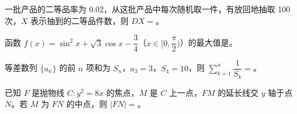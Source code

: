 \begin{question}
一批产品的二等品率为 0.02，从这批产品中每次随机取一件，有放回地抽取 100 次，\(X\) 表示抽到的二等品件数，则 \(DX=\)\gkblank{}。

\end{question}
\begin{question}
函数 \(f(x)=\sin^2x+\sqrt{3}\cos x-\dfrac{3}{4}\)（\(x\in[0,\dfrac{\pi}{2})\)）的最大值是\gkblank{}。

\end{question}
\begin{question}
等差数列 \(\{a_n\}\) 的前 \(n\) 项和为 \(S_n\)，\(a_3=3\)，\(S_4=10\)，则 \(\displaystyle\sum_{k=1}^{n}\dfrac{1}{S_k}=\)\gkblank{}。

\end{question}
\begin{question}
已知 \(F\) 是抛物线 \(C:y^2=8x\) 的焦点，\(M\) 是 \(C\) 上一点，\(FM\) 的延长线交 \(y\) 轴于点 \(N\)。若 \(M\) 为 \(FN\) 的中点，则 \(|FN|=\)\gkblank{}。

\end{question}

